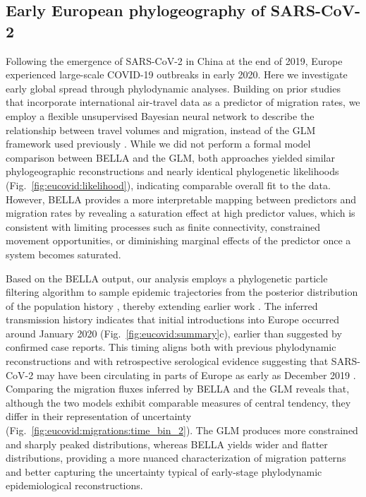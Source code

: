 \subsection{Early European phylogeography of SARS-CoV-2}

Following the emergence of SARS-CoV-2 in China at the end of 2019, Europe experienced large-scale COVID-19 outbreaks in early 2020.
Here we investigate early global spread through phylodynamic analyses.
Building on prior studies that incorporate international air-travel data as a predictor of migration rates, we employ a flexible unsupervised Bayesian neural network to describe the relationship between travel volumes and migration, instead of the GLM framework used previously \citep{valenzuela2021comprehensive}.
While we did not perform a formal model comparison between BELLA and the GLM, both approaches yielded similar phylogeographic reconstructions and nearly identical phylogenetic likelihoods (Fig.~\ref{fig:eucovid:likelihood}), indicating comparable overall fit to the data. However, BELLA provides a more interpretable mapping between predictors and migration rates by revealing a saturation effect at high predictor values, which is consistent with limiting processes such as finite connectivity, constrained movement opportunities, or diminishing marginal effects of the predictor once a system becomes saturated.

Based on the BELLA output, our analysis employs a phylogenetic particle filtering algorithm to sample epidemic trajectories from the posterior distribution of the population history \cite{vaughan2019estimating, vaughan2024estimates}, thereby extending earlier work \citep{nadeau2021origin}. 
The inferred transmission history indicates that initial introductions into Europe occurred around January 2020 (Fig.~\ref{fig:eucovid:summary}c), earlier than suggested by confirmed case reports.
This timing aligns both with previous phylodynamic reconstructions \citep{valenzuela2021comprehensive} and with retrospective serological evidence suggesting that SARS-CoV-2 may have been circulating in parts of Europe as early as December 2019 \citep{carrat2021evidence, amendola2021evidence}. 
Comparing the migration fluxes inferred by BELLA and the GLM reveals that, although the two models exhibit comparable measures of central tendency, they differ in their representation of uncertainty (Fig.~\ref{fig:eucovid:migrations:time_bin_2}). The GLM produces more constrained and sharply peaked distributions, whereas BELLA yields wider and flatter distributions, providing a more nuanced characterization of migration patterns and better capturing the uncertainty typical of early-stage phylodynamic epidemiological reconstructions.